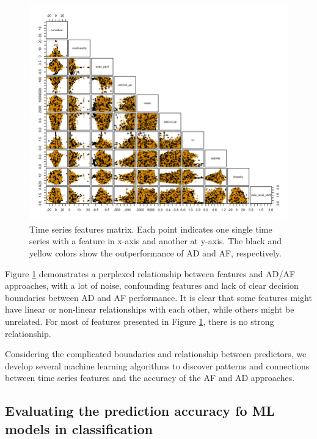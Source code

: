 \documentclass[]{elsarticle} %
\begin{document}
\begin{figure}[H]

{\centering \includegraphics[width=1\linewidth]{img/300dpi/pair_plot} 

}

\caption{Time series features matrix. Each point indicates one single time series with a feature in x-axis and another at y-axis. The black and yellow colors show the outperformance of AD and AF, respectively.}\label{fig:featuresmatrix}
\end{figure}

Figure \ref{fig:featuresmatrix} demonstrates a perplexed relationship
between features and AD/AF approaches, with a lot of noise, confounding
features and lack of clear decision boundaries between AD and AF
performance. It is clear that some features might have linear or
non-linear relationships with each other, while others might be
unrelated. For most of features presented in Figure
\ref{fig:featuresmatrix}, there is no strong relationship.

Considering the complicated boundaries and relationship between
predictors, we develop several machine learning algorithms to discover
patterns and connections between time series features and the accuracy
of the AF and AD approaches.

\hypertarget{evaluating-the-prediction-accuracy-fo-ml-models-in-classification}{%
\subsection{Evaluating the prediction accuracy fo ML models in
classification}\label{evaluating-the-prediction-accuracy-fo-ml-models-in-classification}}
\end{document}
